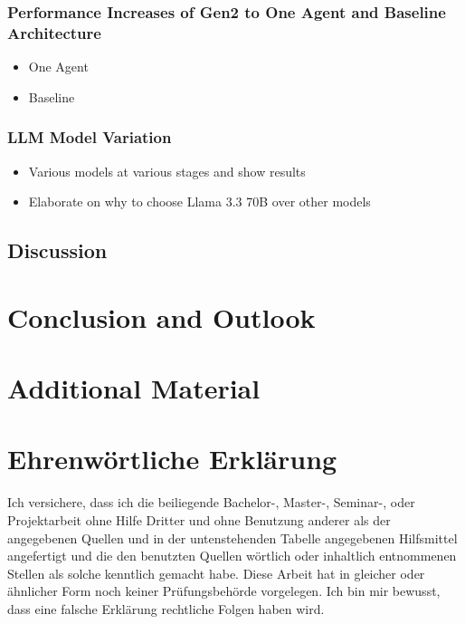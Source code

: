 \documentclass[a4paper,oneside,bibliography=totoc]{scrbook}
\begin{document}
\subsection{Performance Increases of Gen2 to One Agent and Baseline Architecture}
\label{subsec:performance_increases_gen2}
\begin{itemize}
  \item One Agent
  \item Baseline
\end{itemize}

\subsection{LLM Model Variation}
\label{subsec:llm_model_variation}
\begin{itemize}
  \item Various models at various stages and show results
  \item Elaborate on why to choose Llama 3.3 70B over other models
\end{itemize}

\section{Discussion}
\label{sec:discussion}


\chapter{Conclusion and Outlook}
\label{ch:conclusion_outlook}




\appendix
\chapter{Additional Material}
\label{ch:additional_material}


\backmatter
\chapter{Ehrenwörtliche Erklärung}
\label{ch:declaration}

Ich versichere, dass ich die beiliegende Bachelor-, Master-, Seminar-, oder
Projektarbeit ohne Hilfe Dritter und ohne Benutzung anderer als der angegebenen
Quellen und in der untenstehenden Tabelle angegebenen Hilfsmittel angefertigt
und die den benutzten Quellen wörtlich oder inhaltlich entnommenen Stellen als
solche kenntlich gemacht habe. Diese Arbeit hat in gleicher oder ähnlicher Form
noch keiner Prüfungsbehörde vorgelegen. Ich bin mir bewusst, dass eine falsche
Erklärung rechtliche Folgen haben wird.
\end{document}
